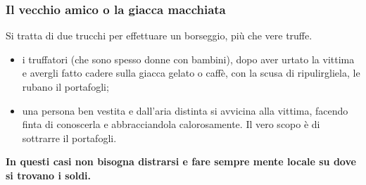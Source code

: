 \documentclass[11pt]{beamer}
\begin{document}
	\begin{frame}
		\frametitle{Il vecchio amico o la giacca macchiata}
		Si tratta di due trucchi per effettuare un borseggio, più che vere truffe.
		\begin{itemize}
			\item i truffatori (che sono spesso donne con bambini), dopo aver urtato la vittima e avergli fatto cadere sulla giacca gelato o caffè, con la scusa di ripulirgliela, le rubano il portafogli;
			\item una persona ben vestita e dall'aria distinta si avvicina alla vittima, facendo finta di conoscerla e abbracciandola calorosamente. Il vero scopo è di sottrarre il portafogli.
		\end{itemize}
		\textbf{In questi casi non bisogna distrarsi e fare sempre mente locale su dove si trovano i soldi.}
	\end{frame}
\end{document}
